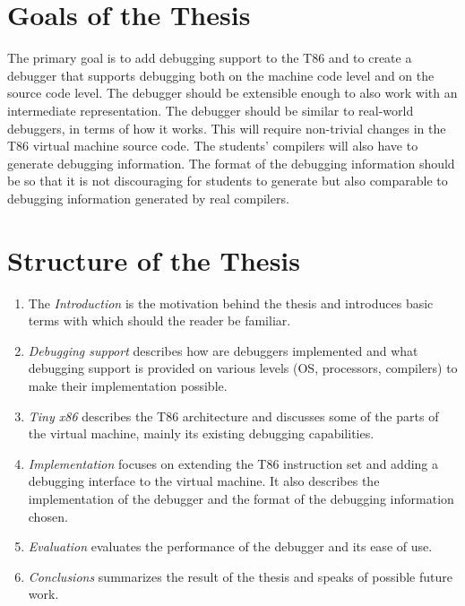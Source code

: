 \section{Goals of the Thesis}
The primary goal is to add debugging support to the T86 and to create a
debugger that supports debugging both on the machine code level and on the
source code level. The debugger should be extensible enough to also work with
an intermediate representation. The debugger should be similar to real-world
debuggers, in terms of how it works. This will require non-trivial changes in
the T86 virtual machine source code. The students' compilers will also have to
generate debugging information. The format of the debugging information should
be so that it is not discouraging for students to generate but also comparable
to debugging information generated by real compilers.

\section{Structure of the Thesis}
\begin{enumerate}
    \item The \textit{Introduction} is the motivation behind the thesis and
        introduces basic terms with which should the reader be familiar.
    \item \textit{Debugging support} describes how are debuggers implemented
        and what debugging support is provided on various levels (OS,
        processors, compilers) to make their implementation possible.
    \item \textit{Tiny x86} describes the T86 architecture and discusses some
        of the parts of the virtual machine, mainly its existing debugging
        capabilities.
    \item \textit{Implementation} focuses on extending the T86 instruction set
        and adding a debugging interface to the virtual machine. It also
        describes the implementation of the debugger and the format of the
        debugging information chosen.
    \item \textit{Evaluation} evaluates the performance of the debugger and its
        ease of use.
    \item \textit{Conclusions} summarizes the result of the thesis and speaks
        of possible future work.
\end{enumerate}
